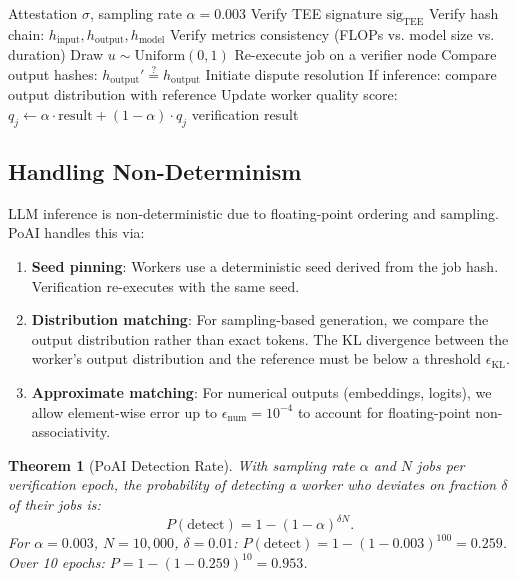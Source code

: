 \documentclass[11pt,twocolumn]{article}
\newtheorem{theorem}{Theorem}
\begin{document}
\begin{algorithm}[H]
\caption{PoAI Statistical Verification}
\label{alg:poai}
\begin{algorithmic}[1]
\Require Attestation $\sigma$, sampling rate $\alpha = 0.003$
\State {}
\State Verify TEE signature $\text{sig}_{\text{TEE}}$
\State Verify hash chain: $h_{\text{input}}, h_{\text{output}}, h_{\text{model}}$
\State Verify metrics consistency (FLOPs vs. model size vs. duration)
\State {}
\State Draw $u \sim \text{Uniform}(0, 1)$
 
    \State Re-execute job on a verifier node
    \State Compare output hashes: $h_{\text{output}}' \stackrel{?}{=} h_{\text{output}}$
        \State Initiate dispute resolution
    \EndIf
\EndIf
\State {}
\State If inference: compare output distribution with reference
\State Update worker quality score: $q_j \gets \alpha \cdot \text{result} + (1-\alpha) \cdot q_j$
\State \Return verification result
\end{algorithmic}
\end{algorithm}

\subsection{Handling Non-Determinism}

LLM inference is non-deterministic due to floating-point ordering and sampling. PoAI handles this via:

\begin{enumerate}[leftmargin=1.4em]
    \item \textbf{Seed pinning}: Workers use a deterministic seed derived from the job hash. Verification re-executes with the same seed.
    \item \textbf{Distribution matching}: For sampling-based generation, we compare the output distribution rather than exact tokens. The KL divergence between the worker's output distribution and the reference must be below a threshold $\epsilon_{\text{KL}}$.
    \item \textbf{Approximate matching}: For numerical outputs (embeddings, logits), we allow element-wise error up to $\epsilon_{\text{num}} = 10^{-4}$ to account for floating-point non-associativity.
\end{enumerate}

\begin{theorem}[PoAI Detection Rate]
\label{thm:detection}
With sampling rate $\alpha$ and $N$ jobs per verification epoch, the probability of detecting a worker who deviates on fraction $\delta$ of their jobs is:
\begin{equation}
P(\text{detect}) = 1 - (1 - \alpha)^{\delta N}.
\end{equation}
For $\alpha = 0.003$, $N = 10{,}000$, $\delta = 0.01$: $P(\text{detect}) = 1 - (1-0.003)^{100} = 0.259$. Over 10 epochs: $P = 1 - (1-0.259)^{10} = 0.953$.
\end{theorem}
\end{document}
